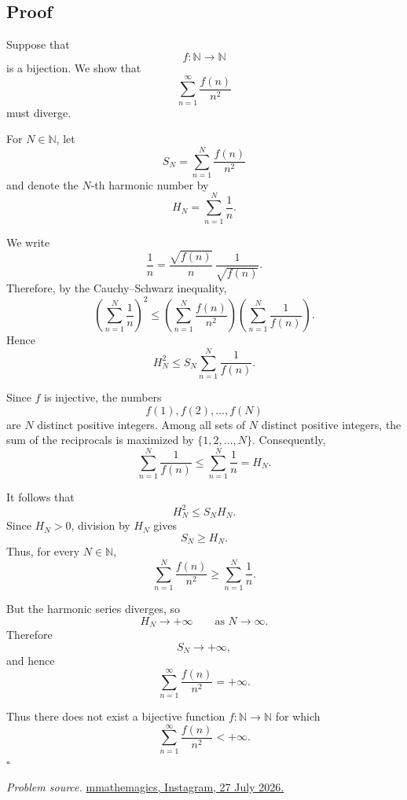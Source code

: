 \documentclass{article}
\begin{document}
\subsection*{Proof}

Suppose that
\[
f:\mathbb{N}\to\mathbb{N}
\]
is a bijection. We show that
\[
\sum_{n=1}^{\infty}\frac{f(n)}{n^2}
\]
must diverge.

For \(N\in\mathbb{N}\), let
\[
S_N=\sum_{n=1}^{N}\frac{f(n)}{n^2}
\]
and denote the \(N\)-th harmonic number by
\[
H_N=\sum_{n=1}^{N}\frac{1}{n}.
\]

We write
\[
\frac{1}{n}
=
\frac{\sqrt{f(n)}}{n}\,
\frac{1}{\sqrt{f(n)}}.
\]
Therefore, by the Cauchy--Schwarz inequality,
\[
\left(\sum_{n=1}^{N}\frac{1}{n}\right)^2
\leq
\left(\sum_{n=1}^{N}\frac{f(n)}{n^2}\right)
\left(\sum_{n=1}^{N}\frac{1}{f(n)}\right).
\]
Hence
\[
H_N^2
\leq
S_N
\sum_{n=1}^{N}\frac{1}{f(n)}.
\]

Since \(f\) is injective, the numbers
\[
f(1),f(2),\ldots,f(N)
\]
are \(N\) distinct positive integers. Among all sets of \(N\) distinct
positive integers, the sum of the reciprocals is maximized by
\(\{1,2,\ldots,N\}\). Consequently,
\[
\sum_{n=1}^{N}\frac{1}{f(n)}
\leq
\sum_{n=1}^{N}\frac{1}{n}
=
H_N.
\]

It follows that
\[
H_N^2
\leq
S_N H_N.
\]
Since \(H_N>0\), division by \(H_N\) gives
\[
S_N\geq H_N.
\]
Thus, for every \(N\in\mathbb{N}\),
\[
\boxed{
\sum_{n=1}^{N}\frac{f(n)}{n^2}
\geq
\sum_{n=1}^{N}\frac{1}{n}.
}
\]

But the harmonic series diverges, so
\[
H_N\longrightarrow+\infty
\qquad\text{as }N\to\infty.
\]
Therefore
\[
S_N\longrightarrow+\infty,
\]
and hence
\[
\sum_{n=1}^{\infty}\frac{f(n)}{n^2}=+\infty.
\]

Thus there does not exist a bijective function
\(f:\mathbb{N}\to\mathbb{N}\) for which
\[
\sum_{n=1}^{\infty}\frac{f(n)}{n^2}<+\infty.
\]
\hfill\(\square\)

\bigskip
\noindent
\textit{Problem source.}
\href{https://www.instagram.com/p/DbRE2FdDOf1/}
{mmathemagics, Instagram, 27 July 2026.}
\end{document}
